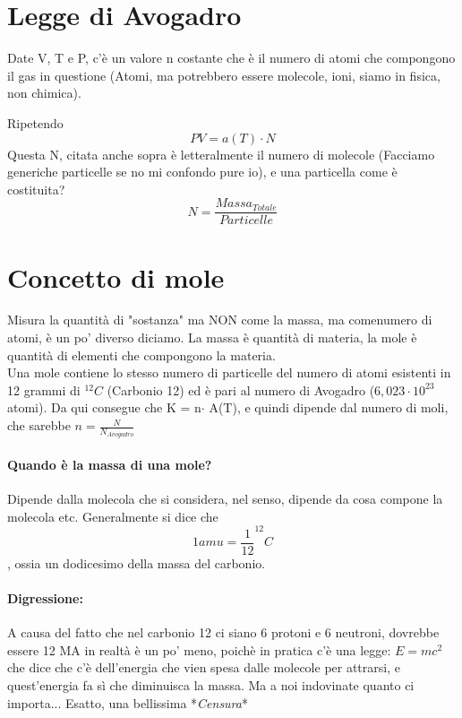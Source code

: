 \documentclass[12pt, a4paper, openany, oneside]{book}
\begin{document}
\section{Legge di Avogadro}
Date V, T e P, c'è un valore n costante che è il numero di atomi che compongono
il gas in questione (Atomi, ma potrebbero essere molecole, ioni, siamo in fisica,
non chimica). 

Ripetendo \[PV = a(T) \cdot N\]
Questa N, citata anche sopra è letteralmente il numero di molecole (Facciamo 
generiche particelle se no mi confondo pure io), e una particella come è 
costituita? \[N = \frac{Massa_{Totale}}{Particelle}\]
\section{Concetto di mole}
Misura la quantità di "sostanza" ma NON come la massa, ma comenumero di atomi, 
è un po' diverso diciamo. La massa è quantità di materia, la mole è quantità 
di elementi che compongono la materia. \\
Una mole contiene lo stesso numero di particelle del numero di atomi esistenti
in 12 grammi di $^{12}C$ (Carbonio 12) ed è pari al numero di Avogadro ($6,023 
\cdot 10^{23}$ atomi).
Da qui consegue che K = n$\cdot$ A(T), e quindi dipende dal numero di moli, che
sarebbe $n = \frac{N}{N_{Avogadro}}$ 
\paragraph{Quando è la massa di una mole? }Dipende dalla molecola che si 
considera, nel senso, dipende da cosa compone la molecola etc. Generalmente
si dice che \[1 amu = \frac{1}{12} ^{12}C\], ossia un dodicesimo della massa 
del carbonio.
\paragraph{Digressione: }A causa del fatto che nel carbonio 12 ci siano 6 
protoni e 6 neutroni, dovrebbe essere 12 MA in realtà è un po' meno, poichè in
pratica c'è una legge: $E = mc^{2}$ che dice che c'è dell'energia che vien 
spesa dalle molecole per attrarsi, e quest'energia fa sì che diminuisca la massa.
Ma a noi indovinate quanto ci importa... Esatto, una bellissima *\textit{Censura}*
\end{document}

